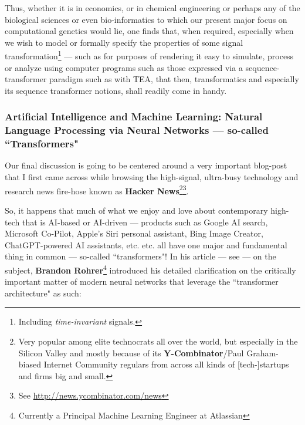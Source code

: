 \documentclass[a4paper, 18pt]{book} %
\begin{document}
\begin{appendices}
\vspace{2em}

Thus, whether it is in economics, or in chemical engineering or perhaps any of the biological sciences or even bio-informatics to which our present major focus on computational genetics would lie, one finds that, when required, especially when we wish to model or formally specify the properties of some signal transformation\footnote{Including \textit{time-invariant} signals\cite{Wang2012}.} --- such as for purposes of rendering it easy to simulate, process or analyze using computer programs such as those expressed via a sequence-transformer paradigm such as with TEA, that then, transformatics and especially its sequence transformer notions, shall readily come in handy. 


\vspace{2em}

\subsubsection{Artificial Intelligence and Machine Learning: Natural Language Processing via Neural Networks --- so-called ``Transformers"}

Our final discussion is going to be centered around a very important blog-post\cite{Rohrer2020} that I first came across while browsing the high-signal, ultra-busy technology and research news fire-hose known as \textbf{Hacker News}\footnote{Very popular among elite technocrats all over the world, but especially in the Silicon Valley and mostly because of its \textbf{Y-Combinator}/Paul Graham-biased Internet Community regulars from across all kinds of [tech-]startups and firms big and small.}\footnote{See \url{http://news.ycombinator.com/news}}.

\vspace{2em}

So, it happens that much of what we enjoy and love about contemporary high-tech that is AI-based or AI-driven --- products such as Google AI search, Microsoft Co-Pilot, Apple's Siri personal assistant, Bing Image Creator, ChatGPT-powered AI assistants, etc. etc. all have one major and fundamental thing in common --- so-called ``transformers"! In his article --- see \cite{Rohrer2020} --- on the subject, \textbf{Brandon Rohrer}\footnote{Currently a Principal Machine Learning Engineer at Atlassian\cite{copilot_dna_assistant}} introduced his detailed clarification on the critically important matter of modern neural networks that leverage the ``transformer architecture" as such:\\




\end{appendices}
\end{document}
